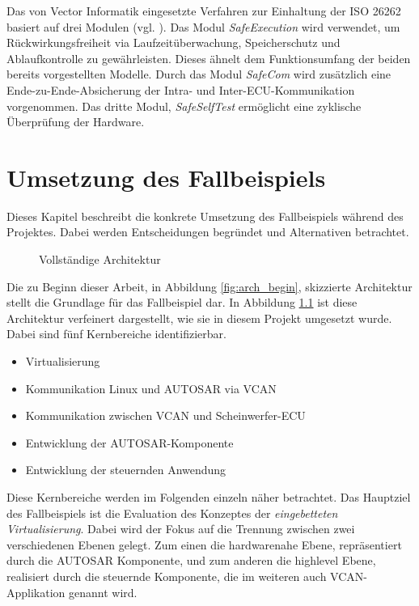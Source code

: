 \documentclass[
  a4paper,					    %
  twoside,
  DIV=calc,     				%
  bibliography=totoc,
  cleardoublepage=empty,
  ngerman,     					%
  final       					%
]{scrbook}
\begin{document}
Das von Vector Informatik eingesetzte Verfahren zur Einhaltung der ISO 26262 basiert auf drei Modulen (vgl. \cite{microsar}). Das Modul \emph{SafeExecution} wird verwendet, um Rückwirkungsfreiheit via Laufzeitüberwachung, Speicherschutz und Ablaufkontrolle zu gewährleisten. Dieses ähnelt dem Funktionsumfang der beiden bereits vorgestellten Modelle. Durch das Modul \emph{SafeCom} wird zusätzlich eine Ende-zu-Ende-Absicherung der Intra- und Inter-ECU-Kommunikation vorgenommen. Das dritte Modul, \emph{SafeSelfTest} ermöglicht eine zyklische Überprüfung der Hardware.









\chapter{Umsetzung des Fallbeispiels}
\label{sec:Umsetzung_Fallbeispiel}
Dieses Kapitel beschreibt die konkrete Umsetzung des Fallbeispiels während des Projektes. Dabei werden Entscheidungen begründet und Alternativen betrachtet.

\begin{figure}[ht]
    \centering
    
    \caption{Vollständige Architektur}
    \label{fig:arch_finished}
\end{figure}

Die zu Beginn dieser Arbeit, in Abbildung \ref{fig:arch_begin}, skizzierte Architektur stellt die Grundlage für das Fallbeispiel dar. In Abbildung \ref{fig:arch_finished} ist diese Architektur verfeinert dargestellt, wie sie in diesem Projekt umgesetzt wurde. Dabei sind fünf Kernbereiche identifizierbar.

\begin{itemize}
    \item Virtualisierung
    \item Kommunikation Linux und AUTOSAR via VCAN
    \item Kommunikation zwischen VCAN und Scheinwerfer-ECU
    \item Entwicklung der AUTOSAR-Komponente
    \item Entwicklung der steuernden Anwendung
\end{itemize}

Diese Kernbereiche werden im Folgenden einzeln näher betrachtet. Das Hauptziel des Fallbeispiels ist die Evaluation des Konzeptes der \emph{eingebetteten Virtualisierung}. Dabei wird der Fokus auf die Trennung zwischen zwei verschiedenen Ebenen gelegt. Zum einen die hardwarenahe Ebene, repräsentiert durch die AUTOSAR Komponente, und zum anderen die highlevel Ebene, realisiert durch die steuernde Komponente, die im weiteren auch VCAN-Applikation genannt wird.
\end{document}
